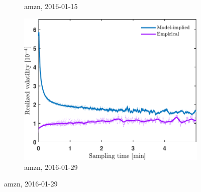 \documentclass[11pt, a4paper]{thesis}  %
\begin{document}
\begin{figure}[H]
\begin{subfigure}[b]{0.3\textwidth}
        \caption{\ac{amzn}, 2016-01-15}
        \label{figure:results:signature_plot:amzn:20160115}
    \end{subfigure}
    \hfill
    \begin{subfigure}[b]{0.3\textwidth}
        \centering
        \includegraphics[width=\textwidth]{./SignaturePlot/AMZN/20160129/signature_plot_predicted_vs_measured.pdf}
        \caption{\ac{amzn}, 2016-01-29}
        \label{figure:results:signature_plot:amzn:20160129}
    \end{subfigure}

    \vfill
    


\end{figure}
\end{document}

